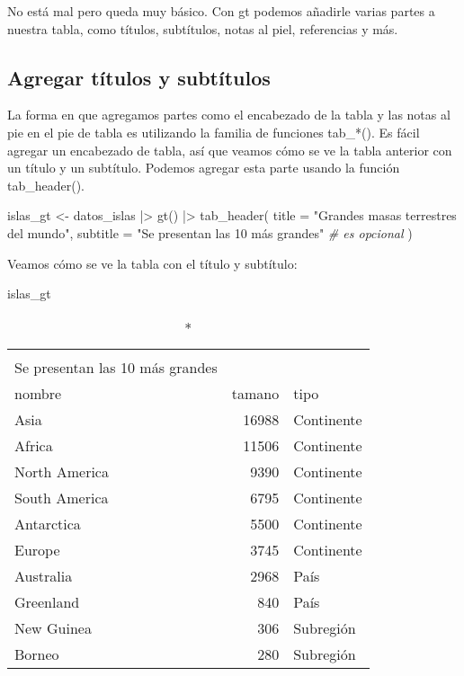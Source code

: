 \documentclass[
]{article}
\newenvironment{Shaded}{\begin{snugshade}}{\end{snugshade}}
\newcommand{\AttributeTok}[1]{\textcolor[rgb]{0.77,0.63,0.00}{#1}}
\newcommand{\CommentTok}[1]{\textcolor[rgb]{0.56,0.35,0.01}{\textit{#1}}}
\newcommand{\FunctionTok}[1]{\textcolor[rgb]{0.00,0.00,0.00}{#1}}
\newcommand{\NormalTok}[1]{#1}
\newcommand{\OtherTok}[1]{\textcolor[rgb]{0.56,0.35,0.01}{#1}}
\newcommand{\SpecialCharTok}[1]{\textcolor[rgb]{0.00,0.00,0.00}{#1}}
\newcommand{\StringTok}[1]{\textcolor[rgb]{0.31,0.60,0.02}{#1}}
\begin{document}
No está mal pero queda muy básico. Con gt podemos añadirle varias partes
a nuestra tabla, como títulos, subtítulos, notas al piel, referencias y
más.

\hypertarget{agregar-tuxedtulos-y-subtuxedtulos}{%
\subsection{Agregar títulos y
subtítulos}\label{agregar-tuxedtulos-y-subtuxedtulos}}

La forma en que agregamos partes como el encabezado de la tabla y las
notas al pie en el pie de tabla es utilizando la familia de funciones
tab\_*(). Es fácil agregar un encabezado de tabla, así que veamos cómo
se ve la tabla anterior con un título y un subtítulo. Podemos agregar
esta parte usando la función tab\_header().

\begin{Shaded}
\begin{Highlighting}[]
\NormalTok{islas\_gt }\OtherTok{\textless{}{-}}\NormalTok{ datos\_islas }\SpecialCharTok{|\textgreater{}} 
  \FunctionTok{gt}\NormalTok{() }\SpecialCharTok{|\textgreater{}} 
   \FunctionTok{tab\_header}\NormalTok{(}
    \AttributeTok{title =} \StringTok{"Grandes masas terrestres del mundo"}\NormalTok{,}
    \AttributeTok{subtitle =} \StringTok{"Se presentan las 10 más grandes"} \CommentTok{\# es opcional}
\NormalTok{  )}
\end{Highlighting}
\end{Shaded}

Veamos cómo se ve la tabla con el título y subtítulo:

\begin{Shaded}
\begin{Highlighting}[]
\NormalTok{islas\_gt}
\end{Highlighting}
\end{Shaded}

\begin{longtable}{lrl}
\caption*{
{\large Grandes masas terrestres del mundo} \\ 
{\small Se presentan las 10 más grandes}
} \\ 
\toprule
nombre & tamano & tipo \\ 
\midrule
Asia & 16988 & Continente \\ 
Africa & 11506 & Continente \\ 
North America & 9390 & Continente \\ 
South America & 6795 & Continente \\ 
Antarctica & 5500 & Continente \\ 
Europe & 3745 & Continente \\ 
Australia & 2968 & País \\ 
Greenland & 840 & País \\ 
New Guinea & 306 & Subregión \\ 
Borneo & 280 & Subregión \\ 
\bottomrule
\end{longtable}
\end{document}
